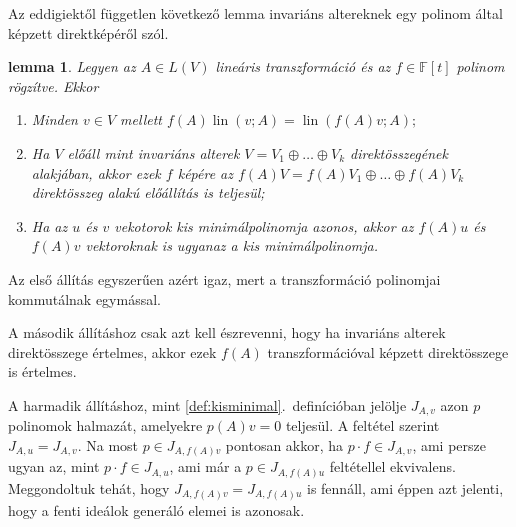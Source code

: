 \documentclass[9pt, a4paper, showtrims]{memoir}
\makeatletter
\renewenvironment{proof}[1][\proofname]
    {\par\pushQED{\qed}%
    \normalfont \topsep6\p@\@plus6\p@\relax
    \trivlist
    \item[\hskip\labelsep
        \itshape
    #1\@addpunct{:}]\ignorespaces}
    {\popQED\endtrivlist\@endpefalse}
\theoremstyle{plain}
\newtheorem{lemma}[proposition]{lemma}
\theoremstyle{remark}
\theoremstyle{definition}
\DeclareMathOperator{\lin}{lin}
\makeatother
\begin{document}
Az eddigiektől független következő lemma invariáns altereknek egy polinom által képzett direktképéről szól.
\begin{lemma}
    Legyen az $A\in L\left( V \right)$ lineáris transzformáció és az $f\in\mathbb{F}\left[t  \right]$
    polinom rögzítve.
    Ekkor
    \begin{enumerate}
        \item Minden $v\in V$ mellett 
            \begin{math}
                f\left( A \right)\lin\left( v;A \right)
                =
                \lin\left( f\left( A \right)v;A \right);
            \end{math}
        \item Ha $V$ előáll mint invariáns alterek $V=V_1\oplus\ldots\oplus V_k$ direktösszegének alakjában, 
            akkor ezek $f$ képére az
            \begin{math}
                f\left( A \right)V
                =
                f\left( A \right)V_1
                \oplus\ldots\oplus
                f\left( A \right)V_k
            \end{math}
            direktösszeg alakú előállítás is teljesül;
        \item
            Ha az $u$ és $v$ vekotorok kis minimálpolinomja azonos,
            akkor az $f\left( A \right)u$ és $f\left( A \right)v$ vektoroknak is ugyanaz a kis minimálpolinomja.
            \qedhere
    \end{enumerate}
    \label{le:cikl-egyert}
\end{lemma}
\begin{proof}
    Az első állítás egyszerűen azért igaz,
    mert a transzformáció polinomjai kommutálnak egymással.

    A második állításhoz csak azt kell észrevenni, 
    hogy ha invariáns alterek direktösszege értelmes,
    akkor ezek $f\left( A \right)$ transzformációval képzett direktösszege is értelmes.

    A harmadik állításhoz, mint \ref{def:kisminimal}.~definícióban jelölje
    \begin{math}
        J_{A,v}
    \end{math}
    azon $p$ polinomok halmazát, amelyekre $p\left( A \right)v=0$ teljesül. 
    A feltétel szerint 
    \begin{math}
        J_{A,u}=J_{A,v}.
    \end{math}
    Na most $p\in J_{A,f\left( A \right)v}$ pontosan akkor,
    ha $p\cdot f\in J_{A,v}$,
    ami persze ugyan az, mint 
    $p\cdot f\in J_{A,u}$, ami már a $p\in J_{A,f\left( A \right)u}$ feltétellel ekvivalens.
    Meggondoltuk tehát, hogy 
    \begin{math}
        J_{A,f\left( A \right)v}
        =
        J_{A,f\left( A \right)u}
    \end{math}
    is fennáll, ami éppen azt jelenti, hogy a fenti ideálok generáló elemei is azonosak.
\end{proof}
\end{document}
